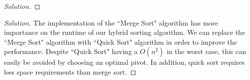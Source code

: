 \documentclass[12pt]{article}
\newenvironment{problem}[2][Problem]{\begin{trivlist}
\item[\hskip \labelsep {\bfseries #1}\hskip \labelsep {\bfseries #2.}]}{\end{trivlist}}
\newenvironment{solution}{\renewcommand\qedsymbol{$\blacksquare$}\begin{proof}[Solution]}{\end{proof}}
\begin{document}
\begin{solution}
\end{solution}

\begin{problem}{5}
\end{problem}

\begin{solution}
The implementation of the ``Merge Sort" algorithm has more importance on the runtime of our hybrid sorting algorithm. We can replace the ``Merge Sort" algorithm with ``Quick Sort" algorithm in order to improve the performance. Despite ``Quick Sort" having a $O(n^2)$ in the worst case, this can easily be avoided by choosing an optimal pivot. In addition, quick sort requires less space requirements than merge sort. 
\end{solution}

\end{document}
